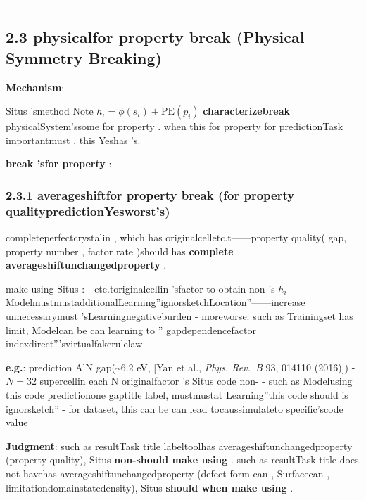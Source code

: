 \documentclass[
  12pt,
]{article}
\begin{document}
\begin{center}\rule{0.5\linewidth}{0.5pt}\end{center}

\subsection{2.3 physicalfor property break (Physical Symmetry
Breaking)}\label{ux7269ux7406ux5bf9ux79f0ux6027ux7834ux574fphysical-symmetry-breaking}

\textbf{Mechanism}: 

Situs 'smethod Note  \(h_i = \phi(s_i) + \text{PE}(p_i)\)
\textbf{characterizebreak }physicalSystem'ssome for property . when this for property for predictionTask importantmust , this Yeshas  's. 

\textbf{break 'sfor property }: 

\subsubsection{2.3.1
averageshiftfor property break (for property qualitypredictionYesworst's)}\label{ux5e73ux79fbux5bf9ux79f0ux6027ux7834ux574fux5bf9ux4f53ux76f8ux6027ux8d28ux9884ux6d4bux662fux574fux7684}

completeperfectcrystalin , which has originalcelletc.t------property quality( gap, property number , factor rate )should has \textbf{complete averageshiftunchangedproperty }. 

make using  Situs :  - etc.toriginalcellin 'sfactor to obtain non-'s \(h_i\) -
ModelmustmustadditionalLearning''ignorsketchLocation''------increase unnecessarymust 'sLearningnegativeburden -
moreworse: such as Trainingset has limit, Modelcan be can learning to '' gapdependencefactor indexdirect'''svirtualfakerulelaw

\textbf{e.g.}: prediction AlN  gap(\textasciitilde6.2 eV, {[}Yan et al.,
\emph{Phys. Rev.~B} 93, 014110 (2016){]}) - \(N=32\) supercellin each  N
originalfactor 's Situs code non- -
such as Modelusing this code predictionone  gaptitle label, mustmustat Learning''this code should is ignorsketch''
- for dataset, this can be can lead tocaussimulateto specific'scode value 

\textbf{Judgment}: such as resultTask title labeltoolhas averageshiftunchangedproperty (property quality), Situs
\textbf{non-should make using }. such as resultTask title does not havehas averageshiftunchangedproperty (defect form can , Surfacecan , limitationdomainstatedensity), Situs
\textbf{should when make using }. 
\end{document}

